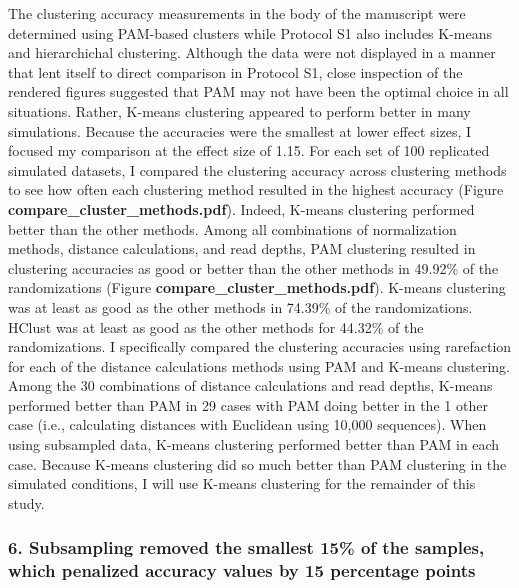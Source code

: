 \documentclass[
]{article}
\begin{document}
The clustering accuracy measurements in the body of the manuscript were
determined using PAM-based clusters while Protocol S1 also includes
K-means and hierarchichal clustering. Although the data were not
displayed in a manner that lent itself to direct comparison in Protocol
S1, close inspection of the rendered figures suggested that PAM may not
have been the optimal choice in all situations. Rather, K-means
clustering appeared to perform better in many simulations. Because the
accuracies were the smallest at lower effect sizes, I focused my
comparison at the effect size of 1.15. For each set of 100 replicated
simulated datasets, I compared the clustering accuracy across clustering
methods to see how often each clustering method resulted in the highest
accuracy (Figure \textbf{compare\_cluster\_methods.pdf}). Indeed,
K-means clustering performed better than the other methods. Among all
combinations of normalization methods, distance calculations, and read
depths, PAM clustering resulted in clustering accuracies as good or
better than the other methods in 49.92\% of the randomizations (Figure
\textbf{compare\_cluster\_methods.pdf}). K-means clustering was at least
as good as the other methods in 74.39\% of the randomizations. HClust
was at least as good as the other methods for 44.32\% of the
randomizations. I specifically compared the clustering accuracies using
rarefaction for each of the distance calculations methods using PAM and
K-means clustering. Among the 30 combinations of distance calculations
and read depths, K-means performed better than PAM in 29 cases with PAM
doing better in the 1 other case (i.e., calculating distances with
Euclidean using 10,000 sequences). When using subsampled data, K-means
clustering performed better than PAM in each case. Because K-means
clustering did so much better than PAM clustering in the simulated
conditions, I will use K-means clustering for the remainder of this
study.

\hypertarget{subsampling-removed-the-smallest-15-of-the-samples-which-penalized-accuracy-values-by-15-percentage-points}{%
\subsubsection{6. Subsampling removed the smallest 15\% of the samples,
which penalized accuracy values by 15 percentage
points}\label{subsampling-removed-the-smallest-15-of-the-samples-which-penalized-accuracy-values-by-15-percentage-points}}
\end{document}

